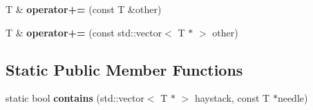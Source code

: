 \begin{DoxyCompactItemize}
\item 
\hypertarget{classtg_taggables_a82b9dee1611abaccf8326d16ab0b68ad}{T \& {\bfseries operator+=} (const T \&other)}\label{classtg_taggables_a82b9dee1611abaccf8326d16ab0b68ad}

\item 
\hypertarget{classtg_taggables_a268d114ffe7ca1256c7fcc527dfd0bf7}{T \& {\bfseries operator+=} (const std\-::vector$<$ T $\ast$ $>$ other)}\label{classtg_taggables_a268d114ffe7ca1256c7fcc527dfd0bf7}

\end{DoxyCompactItemize}
\subsection*{Static Public Member Functions}
\begin{DoxyCompactItemize}
\item 
\hypertarget{classtg_taggables_ae0c1c79f02a785019b037842b056cac1}{static bool {\bfseries contains} (std\-::vector$<$ T $\ast$ $>$ haystack, const T $\ast$needle)}\label{classtg_taggables_ae0c1c79f02a785019b037842b056cac1}

\end{DoxyCompactItemize}

